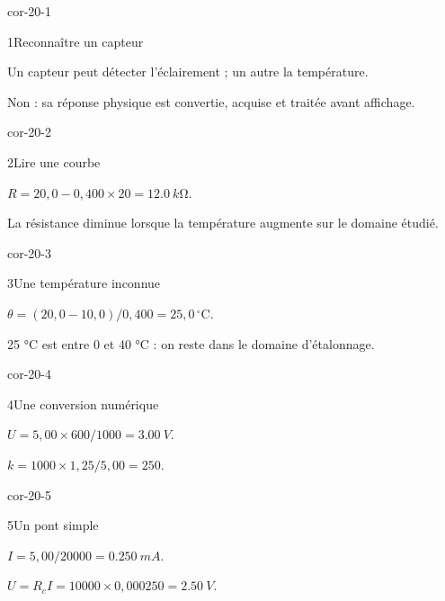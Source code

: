 \clearpage{}
\corrigesSouples
\begin{blocLivre}{cor-20-1}\begin{corrige}{1}{Reconnaître un capteur}
\begin{questions}
\item Un capteur peut détecter l’éclairement ; un autre la température.
\item Non : sa réponse physique est convertie, acquise et traitée avant affichage.
\end{questions}
\end{corrige}\end{blocLivre}
\begin{blocLivre}{cor-20-2}\begin{corrige}{2}{Lire une courbe}
\begin{questions}
\item $R=20,0-0,400\times20=\qty{12,0}{k\ohm}$.
\item La résistance diminue lorsque la température augmente sur le domaine étudié.
\end{questions}
\end{corrige}\end{blocLivre}
\begin{blocLivre}{cor-20-3}\begin{corrige}{3}{Une température inconnue}
\begin{questions}
\item $\theta=(20,0-10,0)/0,400=25,0\,^{\circ}\mathrm C$.
\item 25 °C est entre 0 et 40 °C : on reste dans le domaine d’étalonnage.
\end{questions}
\end{corrige}\end{blocLivre}
\begin{blocLivre}{cor-20-4}\begin{corrige}{4}{Une conversion numérique}
\begin{questions}
\item $U=5,00\times600/1000=\qty{3,00}{V}$.
\item $k=1000\times1,25/5,00=250$.
\end{questions}
\end{corrige}\end{blocLivre}
\begin{blocLivre}{cor-20-5}\begin{corrige}{5}{Un pont simple}
\begin{questions}
\item $I=5,00/20000=\qty{0,250}{mA}$.
\item $U=R_cI=10000\times0,000250=\qty{2,50}{V}$.
\end{questions}
\end{corrige}\end{blocLivre}
